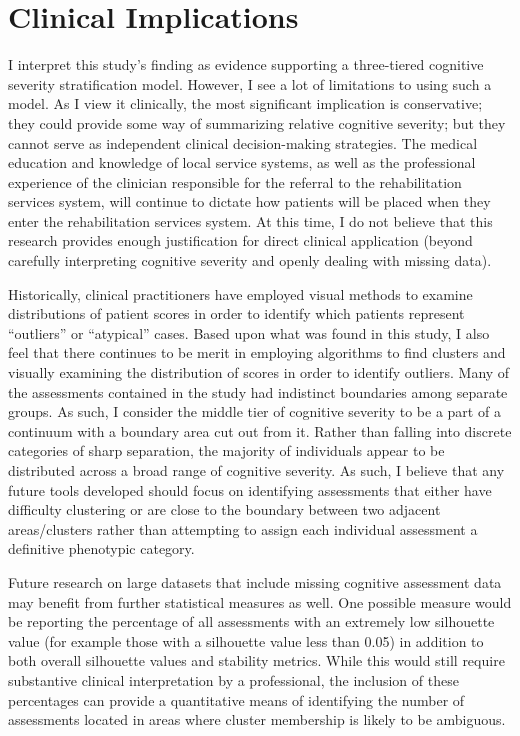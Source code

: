\section{Clinical Implications}
I interpret this study's finding as evidence supporting a three-tiered cognitive severity stratification model. However, I see a lot of limitations to using such a model. As I view it clinically, the most significant implication is conservative; they could provide some way of summarizing relative cognitive severity; but they cannot serve as independent clinical decision-making strategies. The medical education and knowledge of local service systems, as well as the professional experience of the clinician responsible for the referral to the rehabilitation services system, will continue to dictate how patients will be placed when they enter the rehabilitation services system. At this time, I do not believe that this research provides enough justification for direct clinical application (beyond carefully interpreting cognitive severity and openly dealing with missing data).

Historically, clinical practitioners have employed visual methods to examine distributions of patient scores in order to identify which patients represent ``outliers'' or ``atypical'' cases. Based upon what was found in this study, I also feel that there continues to be merit in employing algorithms to find clusters and visually examining the distribution of scores in order to identify outliers. Many of the assessments contained in the study had indistinct boundaries among separate groups. As such, I consider the middle tier of cognitive severity to be a part of a continuum with a boundary area cut out from it. Rather than falling into discrete categories of sharp separation, the majority of individuals appear to be distributed across a broad range of cognitive severity. As such, I believe that any future tools developed should focus on identifying assessments that either have difficulty clustering or are close to the boundary between two adjacent areas/clusters rather than attempting to assign each individual assessment a definitive phenotypic category.

Future research on large datasets that include missing cognitive assessment data may benefit from further statistical measures as well. One possible measure would be reporting the percentage of all assessments with an extremely low silhouette value (for example those with a silhouette value less than 0.05) in addition to both overall silhouette values and stability metrics. While this would still require substantive clinical interpretation by a professional, the inclusion of these percentages can provide a quantitative means of identifying the number of assessments located in areas where cluster membership is likely to be ambiguous.

